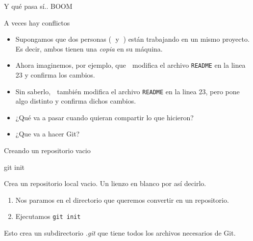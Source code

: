 \begin{frame}[t]{Y qué pasa sí.. BOOM}

    \begin{block}{A veces hay conflictos}
        \begin{itemize}
            \item Supongamos que dos personas (👨 y 👩) están trabajando en un mismo proyecto.
                Es decir, ambos tienen una \textit{copia} en su máquina.
            \pause
            \item Ahora imaginemos, por ejemplo, que 👨 modifica el archivo \texttt{README} en la linea 23
                y confirma los cambios.
            \pause
            \item Sin saberlo, 👩 también modifica el archivo \texttt{README} en la linea 23, pero pone algo distinto y confirma dichos cambios.
            \pause
            \item ¿Qué va a pasar cuando quieran compartir lo que hicieron?\\ 
            \pause
            \item ¿Que va a hacer Git?\\ 
        \end{itemize}
    \end{block}

\end{frame}

\begin{frame}[t]{Creando un repositorio vacio}
    \begin{comando}
        git init
    \end{comando}

    \pause
    \begin{block}{}
        Crea un repositorio local vacio. Un lienzo en blanco por así decirlo.
        \begin{enumerate}
            \item Nos paramos en el directorio que queremos convertir en un repositorio.
            \item Ejecutamos \texttt{git init}
        \end{enumerate}
        Esto crea un subdirectorio \textit{.git} que tiene todos los archivos necesarios de Git.
    \end{block}
\end{frame}

